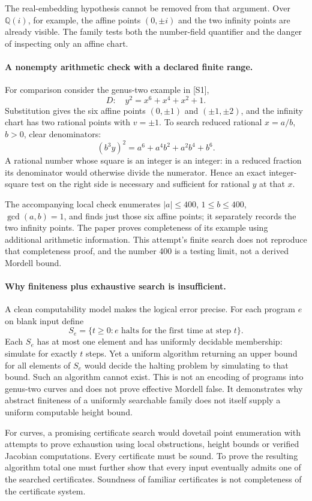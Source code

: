 \documentclass[11pt]{article}
\begin{document}
The real-embedding hypothesis cannot be removed from that argument.
Over $\mathbb Q(i)$, for example, the affine points $(0,\pm i)$ and
the two infinity points are already visible. The family tests both
the number-field quantifier and the danger of inspecting only an
affine chart.

\paragraph{A nonempty arithmetic check with a declared finite range.}
For comparison consider the genus-two example in [S1],
\[
                         D:\quad y^2=x^6+x^4+x^2+1.
\]
Substitution gives the six affine points $(0,\pm1)$ and
$(\pm1,\pm2)$, and the infinity chart has two rational points with
$v=\pm1$. To search reduced rational $x=a/b$, $b>0$, clear
denominators:
\[
             (b^3y)^2=a^6+a^4b^2+a^2b^4+b^6.
\]
A rational number whose square is an integer is an integer: in a
reduced fraction its denominator would otherwise divide the
numerator. Hence an exact integer-square test on the right side is
necessary and sufficient for rational $y$ at that $x$.

The accompanying local check enumerates $|a|\le400$, $1\le b\le400$,
$\gcd(a,b)=1$, and finds just those six affine points; it separately
records the two infinity points. The paper proves completeness of its
example using additional arithmetic information. This attempt's
finite search does not reproduce that completeness proof, and the
number 400 is a testing limit, not a derived Mordell bound.

\paragraph{Why finiteness plus exhaustive search is insufficient.}
A clean computability model makes the logical error precise. For each
program $e$ on blank input define
\[
 S_e=\{t\ge0:e\text{ halts for the first time at step }t\}.
\]
Each $S_e$ has at most one element and has uniformly decidable
membership: simulate for exactly $t$ steps. Yet a uniform algorithm
returning an upper bound for all elements of $S_e$ would decide the
halting problem by simulating to that bound. Such an algorithm cannot
exist. This is not an encoding of programs into genus-two curves and
does not prove effective Mordell false. It demonstrates why abstract
finiteness of a uniformly searchable family does not itself supply a
uniform computable height bound.

For curves, a promising certificate search would dovetail point
enumeration with attempts to prove exhaustion using local obstructions,
height bounds or verified Jacobian computations. Every certificate
must be sound. To prove the resulting algorithm total one must further
show that every input eventually admits one of the searched
certificates. Soundness of familiar certificates is not completeness
of the certificate system.
\end{document}
